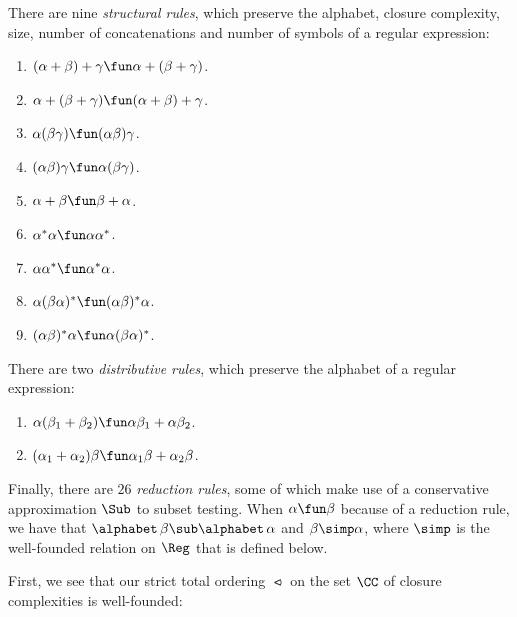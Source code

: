There are nine \emph{structural rules},
%
%
%
which preserve the alphabet, closure complexity, size, number of
concatenations and number of symbols of a regular expression:
\begin{enumerate}[\quad(1)]
\item $(\alpha + \beta) + \gamma \fun \alpha + (\beta + \gamma)$.

\item $\alpha + (\beta + \gamma) \fun (\alpha + \beta) + \gamma$.

\item $\alpha(\beta\gamma) \fun (\alpha\beta)\gamma$.

\item $(\alpha\beta)\gamma \fun \alpha(\beta\gamma)$.

\item $\alpha + \beta \fun \beta + \alpha$.

\item $\alpha^*\alpha \fun \alpha\alpha^*$.

\item $\alpha\alpha^* \fun \alpha^*\alpha$.

\item $\alpha(\beta\alpha)^* \fun (\alpha\beta)^*\alpha$.

\item $(\alpha\beta)^*\alpha \fun \alpha(\beta\alpha)^*$.
\end{enumerate}

There are two \emph{distributive rules}, which preserve the
alphabet of a regular expression:
\begin{enumerate}[\quad(1)]
\item $\alpha(\beta_1 + \beta_2) \fun \alpha \beta_1 + \alpha \beta_2$.

\item $(\alpha_1 + \alpha_2)\beta \fun \alpha_1 \beta + \alpha_2 \beta$.
\end{enumerate}

Finally, there are $26$ \emph{reduction rules}, some of which make use
of a conservative approximation $\Sub$ to subset testing.  When
$\alpha\fun\beta$ because of a reduction rule, we have that
$\alphabet\,\beta\sub\alphabet\,\alpha$ and $\beta\simp\alpha$, where
$\simp$ is the well-founded relation on $\Reg$ that is defined below.

First, we see that our strict total ordering $\ltcc$ on the set $\CC$
of closure complexities is well-founded:

